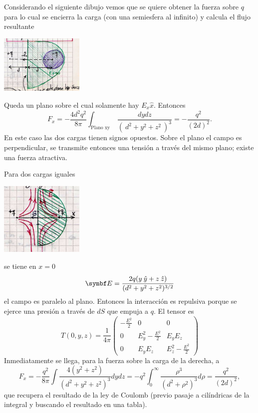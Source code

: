 \documentclass[10pt,oneside]{CBFT_book}
\begin{document}
\begin{ejemplo}{}

Considerando el siguiente dibujo vemos que se quiere obtener la fuerza sobre $q$ para lo cual se
encierra la carga (con una semiesfera al infinito) y calcula el flujo resultante

\includegraphics[width=0.3\textwidth]{images/fig_ft1_tensorMax_C.jpg}

Queda un plano sobre el cual solamente hay $E_x\hat{x}$.
Entonces
\[
	F_x = -\frac{4d^2q^2}{8\pi} \int_{\text{Plano xy}} \: \frac{dy dz}{( \: d^2 + y^2 + z^2 \: )^3} = 
	- \frac{q^2}{( 2 d )^2}.
\]
En este caso las dos cargas tienen signos opuestos. Sobre el plano el campo es perpendicular,
se transmite entonces una tensión a través del mismo plano; existe una fuerza atractiva.

Para dos cargas iguales

\includegraphics[width=0.3\textwidth]{images/fig_ft1_tensorMax_D.jpg}

se tiene en $x=0$
\[
	\vb{E} = \frac{ 2 q ( y \yver + z \zver )}{( d^2 + y^2 + z^2 )^{3/2}}
\]
el campo es paralelo al plano. Entonces la interacción es repulsiva porque se ejerce una presión a
través de $dS$ que empuja a $q$. El tensor es
\[
	T(0,y,z) = \frac{1}{4\pi}\begin{pmatrix}
	        -\frac{E^2}{2} & 0 & 0 \\
		0 & E_y^2 - \frac{E^2}{2} & E_y E_z \\
		0 & E_y E_z & E_z^2 - \frac{E^2}{2} 
	\end{pmatrix}
\]
Inmediatamente se llega, para la fuerza sobre la carga de la derecha, a
\[
	F_x = - \frac{q^2}{ 8 \pi } \int \frac{ 4 ( y^2 + z^2 ) }{( d^2 + y^2 + z^2 )^3} dy dz = 
	- q^2 \int_0^\infty \frac{ \rho^3 }{(d^2 + \rho^2)^3} d\rho = 
	\frac{q^2}{(2d)^2},
\]
que recupera el resultado de la ley de Coulomb (previo pasaje a cilíndricas de la integral
y buscando el resultado en una tabla).

\end{ejemplo}
\end{document}
